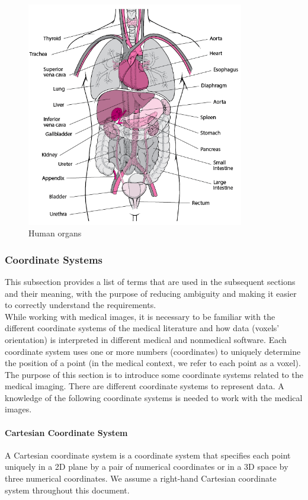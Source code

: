 \documentclass[12pt]{article}
\begin{document}
\begin{figure}[H]
\centering
\includegraphics[width=95mm]{humanOrgans}
\caption{Human organs ~\cite{TissuesAndOrgans}}
\label{FigHO}
\end{figure}

\subsubsection{Coordinate Systems}
This subsection provides a list of terms that are used in the subsequent
sections and their meaning, with the purpose of reducing ambiguity and making it
easier to correctly understand the requirements. \cite{Nejad2017} \\

\noindent While working with medical images, it is necessary to be familiar with the different coordinate systems of the medical literature and how data (voxels' orientation) is interpreted in different medical and nonmedical software. Each coordinate system uses one or more numbers (coordinates) to uniquely determine the position of a point (in the medical context, we refer to each point as a voxel). The purpose of this section is to introduce some coordinate systems related to the medical imaging. There are different coordinate systems to represent data. A knowledge of the following coordinate systems is needed to work with the medical images.

\paragraph{Cartesian Coordinate System}
A Cartesian coordinate system is a coordinate system that specifies each point uniquely in a 2D plane by a pair of numerical coordinates or in a 3D space by three numerical coordinates. We assume a right-hand Cartesian coordinate system throughout this document.
\end{document}
